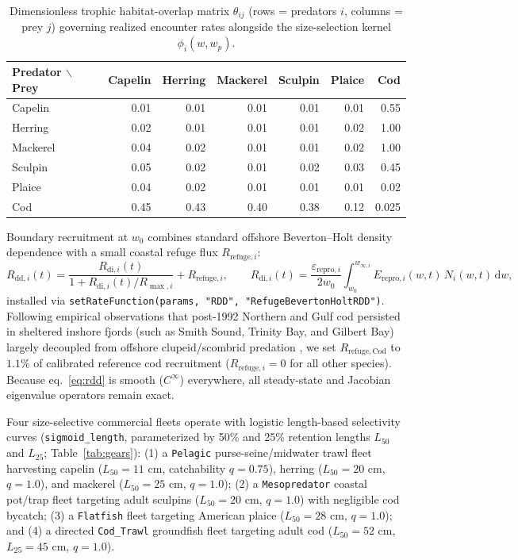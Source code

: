 \documentclass[11pt,letterpaper]{article}
\begin{document}
\begin{table}[t!]
\centering
\caption{Dimensionless trophic habitat-overlap matrix $\theta_{ij}$ (rows = predators $i$, columns = prey $j$) governing realized encounter rates alongside the size-selection kernel $\phi_i(w, w_p)$.}
\label{tab:inter}
\vspace{0.4em}
{\small
\setlength{\tabcolsep}{7pt}
\begin{tabular}{lrrrrrr}
\hline
Predator $\backslash$ Prey & Capelin & Herring & Mackerel & Sculpin & Plaice & Cod \\
\hline
Capelin   & 0.01 & 0.01 & 0.01 & 0.01 & 0.01 & 0.55 \\
Herring   & 0.02 & 0.01 & 0.01 & 0.01 & 0.02 & 1.00 \\
Mackerel  & 0.04 & 0.02 & 0.01 & 0.01 & 0.02 & 1.00 \\
Sculpin   & 0.05 & 0.02 & 0.01 & 0.02 & 0.03 & 0.45 \\
Plaice    & 0.04 & 0.02 & 0.01 & 0.01 & 0.01 & 0.02 \\
Cod       & 0.45 & 0.43 & 0.40 & 0.38 & 0.12 & 0.025 \\
\hline
\end{tabular}
}
\end{table}

Boundary recruitment at $w_0$ combines standard offshore Beverton--Holt density dependence with a small coastal refuge flux $R_{\mathrm{refuge},i}$:
\begin{equation}
  R_{\mathrm{dd},i}(t) = \frac{R_{\mathrm{di},i}(t)}{1 + R_{\mathrm{di},i}(t) / R_{\max,i}} + R_{\mathrm{refuge},i}, \qquad
  R_{\mathrm{di},i}(t) = \frac{\varepsilon_{\mathrm{repro},i}}{2 w_0} \int_{w_0}^{w_{\infty,i}} E_{\mathrm{repro},i}(w,t)\,N_i(w,t)\,\mathrm{d}w,
  \label{eq:rdd}
\end{equation}
installed via \texttt{setRateFunction(params, "RDD", "RefugeBevertonHoltRDD")}. Following empirical observations that post-1992 Northern and Gulf cod persisted in sheltered inshore fjords (such as Smith Sound, Trinity Bay, and Gilbert Bay) largely decoupled from offshore clupeid/scombrid predation \citep{lilly2013review}, we set $R_{\mathrm{refuge,Cod}}$ to $1.1\%$ of calibrated reference cod recruitment ($R_{\mathrm{refuge},i} = 0$ for all other species). Because eq.~\eqref{eq:rdd} is smooth ($C^\infty$) everywhere, all steady-state and Jacobian eigenvalue operators remain exact.

Four size-selective commercial fleets operate with logistic length-based selectivity curves (\texttt{sigmoid\_\allowbreak length}, parameterized by 50\% and 25\% retention lengths $L_{50}$ and $L_{25}$; Table~\ref{tab:gears}): (1) a \texttt{Pelagic} purse-seine/midwater trawl fleet harvesting capelin ($L_{50} = 11\text{ cm}$, catchability $q = 0.75$), herring ($L_{50} = 20\text{ cm}$, $q = 1.0$), and mackerel ($L_{50} = 25\text{ cm}$, $q = 1.0$); (2) a \texttt{Mesopredator} coastal pot/trap fleet targeting adult sculpins ($L_{50} = 20\text{ cm}$, $q = 1.0$) with negligible cod bycatch; (3) a \texttt{Flatfish} fleet targeting American plaice ($L_{50} = 28\text{ cm}$, $q = 1.0$); and (4) a directed \texttt{Cod\_Trawl} groundfish fleet targeting adult cod ($L_{50} = 52\text{ cm}$, $L_{25} = 45\text{ cm}$, $q = 1.0$).
\end{document}
